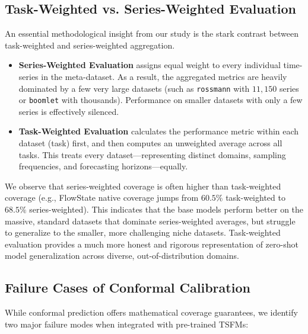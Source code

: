 \documentclass[12pt, a4paper]{article}
\begin{document}
\subsection{Task-Weighted vs. Series-Weighted Evaluation}
An essential methodological insight from our study is the stark contrast between task-weighted and series-weighted aggregation.
\begin{itemize}
	\item \textbf{Series-Weighted Evaluation} assigns equal weight to every individual time-series in the meta-dataset. As a result, the aggregated metrics are heavily dominated by a few very large datasets (such as \texttt{rossmann} with \(11,150\) series or \texttt{boomlet} with thousands). Performance on smaller datasets with only a few series is effectively silenced.
	\item \textbf{Task-Weighted Evaluation} calculates the performance metric within each dataset (task) first, and then computes an unweighted average across all tasks. This treats every dataset---representing distinct domains, sampling frequencies, and forecasting horizons---equally.
\end{itemize}
We observe that series-weighted coverage is often higher than task-weighted coverage (e.g., FlowState native coverage jumps from \(60.5\%\) task-weighted to \(68.5\%\) series-weighted). This indicates that the base models perform better on the massive, standard datasets that dominate series-weighted averages, but struggle to generalize to the smaller, more challenging niche datasets. Task-weighted evaluation provides a much more honest and rigorous representation of zero-shot model generalization across diverse, out-of-distribution domains.

\subsection{Failure Cases of Conformal Calibration}
While conformal prediction offers mathematical coverage guarantees, we identify two major failure modes when integrated with pre-trained TSFMs:
\end{document}
